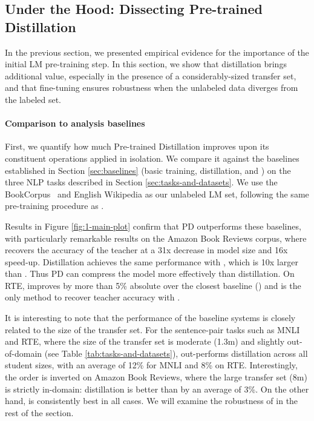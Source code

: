 \subsection{Under the Hood: Dissecting Pre-trained Distillation}
\label{sec:dissection}

In the previous section, we presented empirical evidence for the importance of the initial LM pre-training step. In this section, we show that distillation brings additional value, especially in the presence of a considerably-sized transfer set, and that fine-tuning ensures robustness when the unlabeled data diverges from the labeled set. 

\paragraph{Comparison to analysis baselines} First, we quantify how much  Pre-trained Distillation improves upon its constituent operations applied in isolation. We compare it against the baselines established in Section \ref{sec:baselines} (basic training, distillation, and \ptft) on the three NLP tasks described in Section \ref{sec:tasks-and-datasets}. We use the BookCorpus~\citep{books-dataset} and English Wikipedia as our unlabeled LM set, following the same pre-training procedure as \citet{bert}.

Results in Figure \ref{fig:1-main-plot} confirm that PD outperforms these baselines, with particularly remarkable results on the Amazon Book Reviews corpus, where \bertmini recovers the accuracy of the teacher at a 31x decrease in model size and 16x speed-up. Distillation achieves the same performance with \bertbase, which is 10x larger than \bertmini. Thus PD can compress the model  more effectively than distillation. On RTE, \recipename improves \berttiny by more than 5\% absolute over the closest baseline (\ptft) and is the only method to recover teacher accuracy with \bertbase.

It is interesting to note that the performance of the baseline systems is closely related to the size of the transfer set. For the sentence-pair tasks such as MNLI and RTE, where the size of the transfer set is moderate (1.3m) and slightly out-of-domain (see Table \ref{tab:tasks-and-datasets}), \ptft out-performs distillation across all student sizes, with an average of 12\%  for MNLI and 8\%  on RTE. Interestingly, the order is inverted on Amazon Book Reviews, where the large transfer set (8m) is strictly in-domain: distillation is better than \ptft by an average of 3\%. On the other hand, \recipename is consistently best in all cases. We will examine the robustness of \recipename in the rest of the section.

